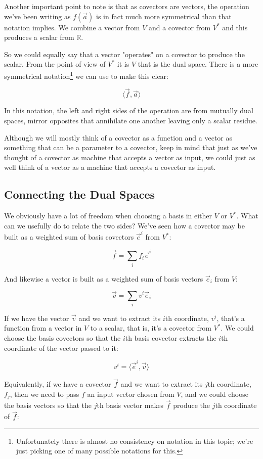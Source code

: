 Another important point to note is that as covectors are vectors, the operation we've been writing as $f(\vec{a})$ is in fact much more symmetrical than that notation implies. We combine a vector from $V$ and a covector from $V^*$ and this produces a scalar from $\mathbb{R}$. 

So we could equally say that a vector "operates" on a covector to produce the scalar. From the point of view of $V^*$ it is $V$ that is the dual space. There is a more symmetrical notation\footnote{Unfortunately there is almost no consistency on notation in this topic; we're just picking one of many possible notations for this.} we can use to make this clear:

$$\langle \vec{f},\vec{a}\rangle$$

In this notation, the left and right sides of the operation are from mutually dual spaces, mirror opposites that annihilate one another leaving only a scalar residue.

Although we will mostly think of a covector as a function and a vector as something that can be a parameter to a covector, keep in mind that just as we've thought of a covector as machine that accepts a vector as input, we could just as well think of a vector as a machine that accepts a covector as input.

\subsection{Connecting the Dual Spaces}

We obviously have a lot of freedom when choosing a basis in either $V$ or $V^*$. What can we usefully do to relate the two sides? We've seen how a covector may be built as a weighted sum of basis covectors $\vec{e}^i$ from $V^*$:

$$
\vec{f} = \sum_i f_i \vec{e}^i
$$

And likewise a vector is built as a weighted sum of basis vectors $\vec{e}_i$ from $V$:

$$
\vec{v} = \sum_i v^i \vec{e}_i
$$

If we have the vector $\vec{v}$ and we want to extract its $i$th coordinate, $v^i$, that's a function from a vector in $V$ to a scalar, that is, it's a covector from $V^*$. We could choose the basis covectors so that the $i$th basis covector extracts the $i$th coordinate of the vector passed to it:

$$
v^i = \langle \vec{e}^i , \vec{v} \rangle
$$ 

Equivalently, if we have a covector $\vec{f}$ and we want to extract its $j$th coordinate, $f_j$, then we need to pass $f$ an input vector chosen from $V$, and we could choose the basis vectors so that the $j$th basis vector makes $\vec{f}$ produce the $j$th coordinate of $\vec{f}$:

